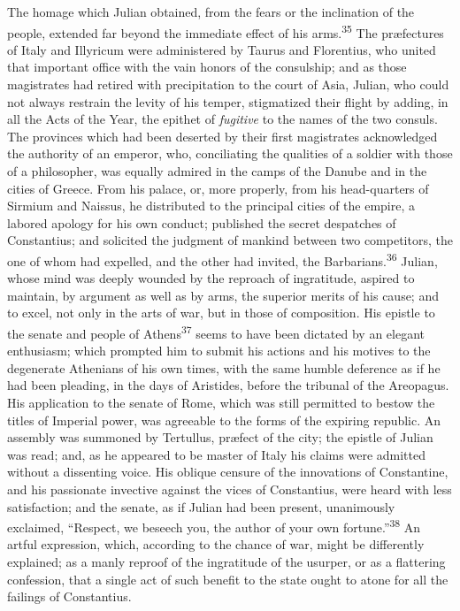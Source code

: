The homage which Julian obtained, from the fears or the
inclination of the people, extended far beyond the immediate
effect of his arms.\textsuperscript{35} The præfectures of Italy and Illyricum
were administered by Taurus and Florentius, who united that
important office with the vain honors of the consulship; and as
those magistrates had retired with precipitation to the court of
Asia, Julian, who could not always restrain the levity of his
temper, stigmatized their flight by adding, in all the Acts of
the Year, the epithet of \textit{fugitive} to the names of the two
consuls. The provinces which had been deserted by their first
magistrates acknowledged the authority of an emperor, who,
conciliating the qualities of a soldier with those of a
philosopher, was equally admired in the camps of the Danube and
in the cities of Greece. From his palace, or, more properly, from
his head-quarters of Sirmium and Naissus, he distributed to the
principal cities of the empire, a labored apology for his own
conduct; published the secret despatches of Constantius; and
solicited the judgment of mankind between two competitors, the
one of whom had expelled, and the other had invited, the
Barbarians.\textsuperscript{36} Julian, whose mind was deeply wounded by the
reproach of ingratitude, aspired to maintain, by argument as well
as by arms, the superior merits of his cause; and to excel, not
only in the arts of war, but in those of composition. His epistle
to the senate and people of Athens\textsuperscript{37} seems to have been dictated
by an elegant enthusiasm; which prompted him to submit his
actions and his motives to the degenerate Athenians of his own
times, with the same humble deference as if he had been pleading,
in the days of Aristides, before the tribunal of the Areopagus.
His application to the senate of Rome, which was still permitted
to bestow the titles of Imperial power, was agreeable to the
forms of the expiring republic. An assembly was summoned by
Tertullus, præfect of the city; the epistle of Julian was read;
and, as he appeared to be master of Italy his claims were
admitted without a dissenting voice. His oblique censure of the
innovations of Constantine, and his passionate invective against
the vices of Constantius, were heard with less satisfaction; and
the senate, as if Julian had been present, unanimously exclaimed,
“Respect, we beseech you, the author of your own fortune.”\textsuperscript{38} An
artful expression, which, according to the chance of war, might
be differently explained; as a manly reproof of the ingratitude
of the usurper, or as a flattering confession, that a single act
of such benefit to the state ought to atone for all the failings
of Constantius.

